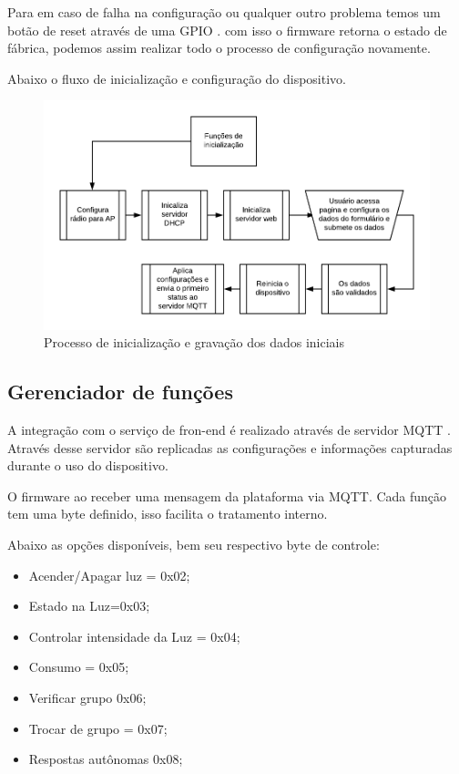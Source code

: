 \documentclass[openright]{normas-utf-tex} %
\begin{document}
Para em caso de falha na configuração ou qualquer outro problema temos um botão de reset através de uma GPIO  \cite{Elsevier}. com isso o firmware retorna o estado de fábrica, podemos assim realizar todo o processo de configuração novamente.

Abaixo o fluxo de inicialização e configuração do dispositivo.
\begin{figure}[!htb]
     \centering
     \includegraphics[scale=1]{Ini_flux.png}
     \caption{Processo de inicialização e gravação dos dados iniciais}
     \label{}
\end{figure}

\subsection{Gerenciador de funções}

A integração com o serviço de fron-end é realizado através de servidor MQTT \cite{Novatec}. Através desse servidor são replicadas as configurações e informações capturadas durante o uso do dispositivo. 

O firmware ao receber uma mensagem da plataforma via MQTT. Cada função tem uma byte definido, isso facilita o tratamento interno.

Abaixo as opções disponíveis, bem seu respectivo byte de controle:

\begin{itemize}
    \item Acender/Apagar luz = 0x02;
    \item Estado na Luz=0x03;
    \item Controlar intensidade da Luz = 0x04;
    \item Consumo = 0x05;
    \item Verificar grupo 0x06;
    \item Trocar de grupo = 0x07;
    \item Respostas autônomas 0x08;
\end{itemize}
\end{document}
